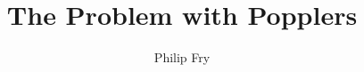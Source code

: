 \documentclass[11pt, letter]{asu}
\title{The Problem with Popplers}
\author{Philip Fry}
\begin{document}
	\begin{preliminary}
		\maketitle
		\tableofcontents
	\end{preliminary}


    
    
    
    
    
    

	\newpage
    
	
\end{document}
